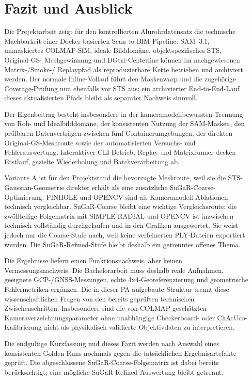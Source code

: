 \section{Fazit und Ausblick}

Die Projektarbeit zeigt für den kontrollierten Alurohrdatensatz die technische
Machbarkeit einer Docker-basierten Scan-to-BIM-Pipeline. SAM~3.1, unmaskiertes
COLMAP-SfM, ideale Bilddomäne, objektspezifisches STS, Original-GS-
Meshgewinnung und DGtal-Centerline können im nachgewiesenen Matrix-/Smoke-/
Replaypfad als reproduzierbare Kette betrieben und archiviert werden. Der
normale Inline-Vollauf führt den Maskenwarp und die zugehörige
Coverage-Prüfung nun ebenfalls vor STS aus; ein archivierter End-to-End-Lauf
dieses aktualisierten Pfads bleibt als separater Nachweis sinnvoll.

Der Eigenbeitrag besteht insbesondere in der kameramodellbewussten Trennung von
Roh- und Idealbilddomäne, der konsistenten Nutzung der SAM-Masken, den
prüfbaren Datenverträgen zwischen fünf Containerumgebungen, der direkten
Original-GS-Meshroute sowie der automatisierten Versuchs- und
Fehlerauswertung. Interaktiver CLI-Betrieb, Replay und Matrixrunner decken
Erstlauf, gezielte Wiederholung und Batchverarbeitung ab.

Variante A ist für den Projektstand die bevorzugte Meshroute, weil sie die
STS-Gaussian-Geometrie direkter erhält als eine zusätzliche SuGaR-Coarse-
Optimierung. PINHOLE und OPENCV sind als Kameramodell-Ablationen technisch
vergleichbar. SuGaR-Coarse bleibt eine wichtige Vergleichsroute; die
zwölfteilige Folgematrix mit SIMPLE-RADIAL und OPENCV ist inzwischen technisch
vollständig durchgelaufen und in den Grafiken ausgewertet. Sie weist jedoch
nur die Coarse-Stufe nach, weil keine verfeinerten PLY-Dateien exportiert
wurden. Die SuGaR-Refined-Stufe bleibt deshalb ein getrenntes offenes Thema.

Die Ergebnisse liefern einen Funktionsnachweis, aber keinen
Vermessungsnachweis. Die Bachelorarbeit muss deshalb reale Aufnahmen,
geeignete GCP-/GNSS-Messungen, echte 4x4-Georeferenzierung und geometrische
Fehlermetriken ergänzen. Die in dieser PA aufgebaute Struktur trennt diese
wissenschaftlichen Fragen von den bereits geprüften technischen
Zwischenschritten. Insbesondere sind die von COLMAP geschätzten
Kameraverzeichnungsparameter ohne unabhängige Checkerboard- oder
ChArUco-Kalibrierung nicht als physikalisch validierte Objektivdaten zu
interpretieren.

Die endgültige Kurzfassung und dieses Fazit werden nach Auswahl eines
konsistenten Golden Runs nochmals gegen die tatsächlichen Ergebnisartefakte
geprüft. Die abgeschlossene SuGaR-Coarse-Folgematrix ist dabei bereits
berücksichtigt; eine mögliche SuGaR-Refined-Auswertung bleibt getrennt.
